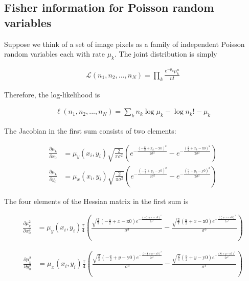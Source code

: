 \documentclass{ucetd}
\begin{document}
\subsection{Fisher information for Poisson random variables}

Suppose we think of a set of image pixels as a family of independent Poisson random variables each with rate $\mu_{k}$. The joint distribution is simply

\begin{align*}
\mathcal{L}(n_{1},n_{2},...,n_{N}) = \prod_{k} \frac{e^{-\mu_{k}}\mu_{k}^{n}}{n!}
\end{align*}

Therefore, the log-likelihood is

\begin{align*}
\ell(n_{1},n_{2},...,n_{N}) = \sum_{k} n_{k}\log\mu_{k} - \log n_{k}! - \mu_{k}
\end{align*}

The Jacobian in the first sum consists of two elements:

\begin{align*}
\frac{\partial \mu_{k}}{\partial x_{0}} &= \mu_{y}(x_{i},y_{i})\sqrt{\frac{2}{\pi\sigma^{2}}}\left(e^{-\frac{\left(-\frac{a}{2}+x_{k}-\text{x0}\right)^2}{2 \sigma ^2}}-e^{-\frac{\left(\frac{a}{2}+x_{k}-\text{x0}\right)^2}{2 \sigma ^2}}\right)\\
\frac{\partial \mu_{k}}{\partial y_{0}} &= \mu_{x}(x_{i},y_{i})\sqrt{\frac{2}{\pi\sigma^{2}}}\left(e^{-\frac{\left(-\frac{a}{2}+y_{k}-\text{y0}\right)^2}{2 \sigma ^2}}-e^{-\frac{\left(\frac{a}{2}+y_{k}-\text{y0}\right)^2}{2 \sigma ^2}}\right)
\end{align*}

The four elements of the Hessian matrix in the first sum is

\begin{align*}
\frac{\partial \mu_{k}^{2}}{\partial x_{0}^{2}} &= \mu_{y}(x_{i},y_{i})\frac{\tau}{4}\left(\frac{\sqrt{\frac{2}{\pi }} \left(-\frac{a}{2}+x-\text{x0}\right) e^{-\frac{\left(-\frac{a}{2}+x-\text{x0}\right)^2}{2 \sigma ^2}}}{\sigma ^3}-\frac{\sqrt{\frac{2}{\pi }} \left(\frac{a}{2}+x-\text{x0}\right) e^{-\frac{\left(\frac{a}{2}+x-\text{x0}\right)^2}{2 \sigma ^2}}}{\sigma ^3}\right)
\end{align*}

\begin{align*}
\frac{\partial \mu_{k}^{2}}{\partial y_{0}^{2}} &= \mu_{x}(x_{i},y_{i})\frac{\tau}{4}\left(\frac{\sqrt{\frac{2}{\pi }} \left(-\frac{a}{2}+y-\text{y0}\right) e^{-\frac{\left(-\frac{a}{2}+y-\text{y0}\right)^2}{2 \sigma ^2}}}{\sigma ^3}-\frac{\sqrt{\frac{2}{\pi }} \left(\frac{a}{2}+y-\text{y0}\right) e^{-\frac{\left(\frac{a}{2}+y-\text{y0}\right)^2}{2 \sigma ^2}}}{\sigma ^3}\right)
\end{align*}
\end{document}
